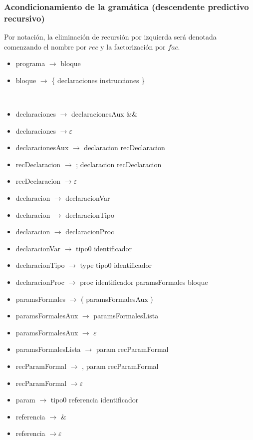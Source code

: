 \documentclass[11pt]{article}
\begin{document}
        \subsubsection{Acondicionamiento de la gramática (descendente predictivo recursivo)}
        Por notación, la eliminación de recursión por izquierda será denotada comenzando el nombre por $rec$ y la factorización por $fac$.  
        \begin{itemize}
            \item programa $\rightarrow$ bloque
            \item bloque $\rightarrow$ \{ declaraciones instrucciones \}
        \end{itemize}
        \
        \begin{itemize}
            \item declaraciones $\rightarrow$ declaracionesAux \&\&
            \item declaraciones $\rightarrow \varepsilon$
            \item declaracionesAux $\rightarrow$ declaracion recDeclaracion
            \item recDeclaracion $\rightarrow$ ; declaracion recDeclaracion
            \item recDeclaracion $\rightarrow \varepsilon$
            \item declaracion $\rightarrow$ declaracionVar
            \item declaracion $\rightarrow$ declaracionTipo
            \item declaracion $\rightarrow$ declaracionProc
            \item declaracionVar $\rightarrow$ tipo0 identificador
            \item declaracionTipo $\rightarrow$ type tipo0 identificador
            \item declaracionProc $\rightarrow$ proc identificador paramsFormales bloque
            \item paramsFormales $\rightarrow$ ( paramsFormalesAux )
            \item paramsFormalesAux $\rightarrow$ paramsFormalesLista
            \item paramsFormalesAux $\rightarrow$ $\varepsilon$
            \item paramsFormalesLista $\rightarrow$ param recParamFormal
            \item recParamFormal $\rightarrow$ , param recParamFormal
            \item recParamFormal $\rightarrow \varepsilon$
            \item param $\rightarrow$ tipo0 referencia identificador
            \item referencia $\rightarrow$ \&
            \item referencia $\rightarrow \varepsilon$
        \end{itemize}
\end{document}
